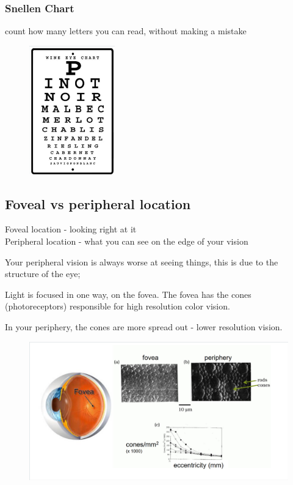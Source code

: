 \documentclass[]{project_plan}
\begin{document}
\subsubsection{Snellen Chart}
count how many letters you can read, without making a mistake
\begin{figure}[h!]
  \centering
  \includegraphics[width=10em]{snellen_chart.png}
\end{figure}

\newpage

\subsection{Foveal vs peripheral location}
Foveal location - looking right at it\\
Peripheral location - what you can see on the edge of your vision

Your peripheral vision is always worse at seeing things, this is
due to the structure of the eye;

Light is focused in one way, on the fovea. The fovea has the cones
(photoreceptors) responsible for high resolution color vision.

In your periphery, the cones are more spread out - lower resolution vision.
\begin{figure}[h!]
  \centering
  \includegraphics[width=\linewidth]{eye_structure.png}
\end{figure}
\end{document}
